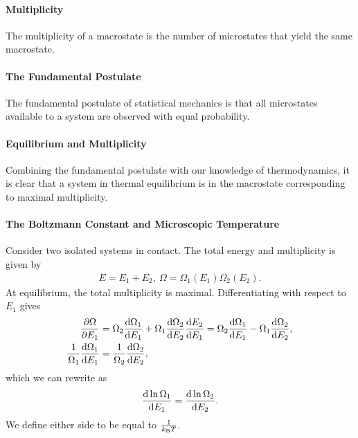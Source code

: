 \paragraph{Multiplicity}
The multiplicity of a macrostate is the number of microstates that yield the same macrostate.

\paragraph{The Fundamental Postulate}
The fundamental postulate of statistical mechanics is that all microstates available to a system are observed with equal probability.

\paragraph{Equilibrium and Multiplicity}
Combining the fundamental postulate with our knowledge of thermodynamics, it is clear that a system in thermal equilibrium is in the macrostate corresponding to maximal multiplicity.

\paragraph{The Boltzmann Constant and Microscopic Temperature}
Consider two isolated systems in contact. The total energy and multiplicity is given by
\begin{align*}
	E = E_{1} + E_{2},\ \Omega = \Omega_{1}(E_{1})\Omega_{2}(E_{2}).
\end{align*}
At equilibrium, the total multiplicity is maximal. Differentiating with respect to $E_{1}$ gives
\begin{align*}
	\pdv{\Omega}{E_{1}}                        &= \Omega_{2}\dv{\Omega_{1}}{E_{1}} + \Omega_{1}\dv{\Omega_{2}}{E_{2}}\dv{E_{2}}{E_{1}} = \Omega_{2}\dv{\Omega_{1}}{E_{1}} - \Omega_{1}\dv{\Omega_{2}}{E_{2}}, \\
	\frac{1}{\Omega_{1}}\dv{\Omega_{1}}{E_{1}} &= \frac{1}{\Omega_{2}}\dv{\Omega_{2}}{E_{2}},
\end{align*}
which we can rewrite as
\begin{align*}
	\dv{\ln{\Omega_{1}}}{E_{1}} = \dv{\ln{\Omega_{2}}}{E_{2}}.
\end{align*}
We define either side to be equal to $\frac{1}{k_{\text{B}} T}$.

